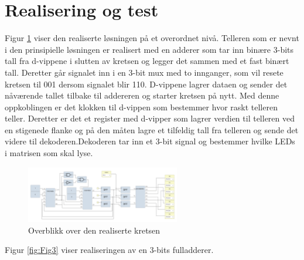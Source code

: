 \section{Realisering og test}
\label{realiseringOgTest}


Figur \ref{fig:Fig2} viser den realiserte løsningen på et overordnet nivå. Telleren som er nevnt i den prinsipielle løsningen er realisert med en adderer som tar inn binære 3-bits tall fra d-vippene i slutten av kretsen og legger det sammen med et fast binært tall. Deretter går signalet inn i en 3-bit mux med to innganger, som vil resete kretsen til 001 dersom signalet blir 110. D-vippene lagrer dataen og sender det nåværende tallet tilbake til addereren og starter kretsen på nytt. Med denne oppkoblingen er det klokken til d-vippen som bestemmer hvor raskt telleren teller. Deretter er det et register med d-vipper som lagrer verdien til telleren ved en stigenede flanke og på den måten lagre et tilfeldig tall fra telleren og sende det videre til dekoderen.Dekoderen tar inn et 3-bit signal og bestemmer hvilke LEDs i matrisen som skal lyse.

\begin{figure}[htbp]
  \centering
  \includegraphics[width=0.6\textwidth]{Bilder/Realisert.png} 
  \caption{Overblikk over den realiserte kretsen}
  \label{fig:Fig2}
\end{figure}


Figur \ref{fig:Fig3} viser realiseringen av en 3-bits fulladderer. 